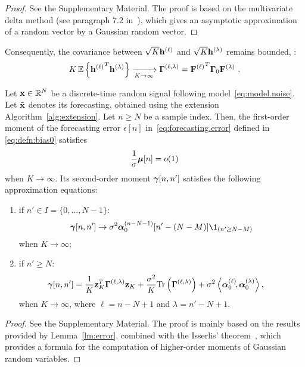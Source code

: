 \begin{proof}
See the Supplementary Material. The proof is based on the multivariate delta method (see paragraph 7.2 in~\cite{Alho05statistical}), which gives an asymptotic approximation of a random vector by a Gaussian random vector.
\end{proof}

Consequently, the covariance between $\sqrt{K}{\mathbf h}^{(\ell)}$ and $\sqrt{K}{\mathbf h}^{(\lambda)}$ remains bounded, \ie:
\begin{equation*}
K\,{\mathbb E}\left\{{{\mathbf h}^{(\ell)}}^T{\mathbf h}^{(\lambda)}\right\} \xrightarrow[K\to\infty]{} \boldsymbol{\Gamma}^{(\ell,\lambda)} = {{\mathbf F}^{(\ell)}}^T\boldsymbol{\Gamma}_0{\mathbf F}^{(\lambda)}\ .
\end{equation*}

\begin{theorem}
\label{th:error}
Let ${\mathbf x}\in{\mathbb R}^N$ be a discrete-time random signal following model~\eqref{eq:model.noise}. Let $\tilde{{\mathbf x}}$ denotes its forecasting, obtained using the extension Algorithm~\ref{alg:extension}. Let $n\geq N$ be a sample index. Then, the first-order moment of the forecasting error $\epsilon[n]$ in~\eqref{eq:forecasting.error} defined in \eqref{eq:defn:bias0} satisfies
\begin{equation}
\frac{1}{\sigma}\bmu[n] = o(1)
\label{eq:mean.error}
\end{equation}
when $K\to\infty$.
Its second-order moment $\boldsymbol{\gamma}[n,n']$ satisfies the following approximation equations:
\begin{enumerate}[label=(\roman*)]
\item if $n'\in I=\{0,\ldots,N-1\}$:
\begin{equation}
\bgamma[n,n']\to \sigma^2\balpha_0^{(n-N-1)}[n'-(N-M)]\1_{(n'\geq N-M)}
\label{eq:cov.error.1}
\end{equation}
when $K\to\infty$;
\item if $n'\geq N$:
\begin{equation}
\hspace{-15pt}\bgamma[n,n'] = \dfrac1K\bz_K^T\bGamma^{(\ell,\lambda)}\bz_K + \dfrac{\sigma^2}{K}\Tr\left(\bGamma^{(\ell,\lambda)}\right) + \sigma^2\left\langle\balpha_0^{(\ell)}\!, \balpha_0^{(\lambda)}\right\rangle ,
\label{eq:cov.error.2}
\end{equation}
when $K\to\infty$, where $\ell\!=n-N+1$ and $\lambda\!=n'-N+1$.
\end{enumerate}
\end{theorem}

\begin{proof}
See the Supplementary Material. The proof is mainly based on the results provided by Lemma~\ref{lm:error}, combined with the Isserlis' theorem~\cite{Isserlis16formula}, which provides a formula for the computation of higher-order moments of Gaussian random variables.
\end{proof}


